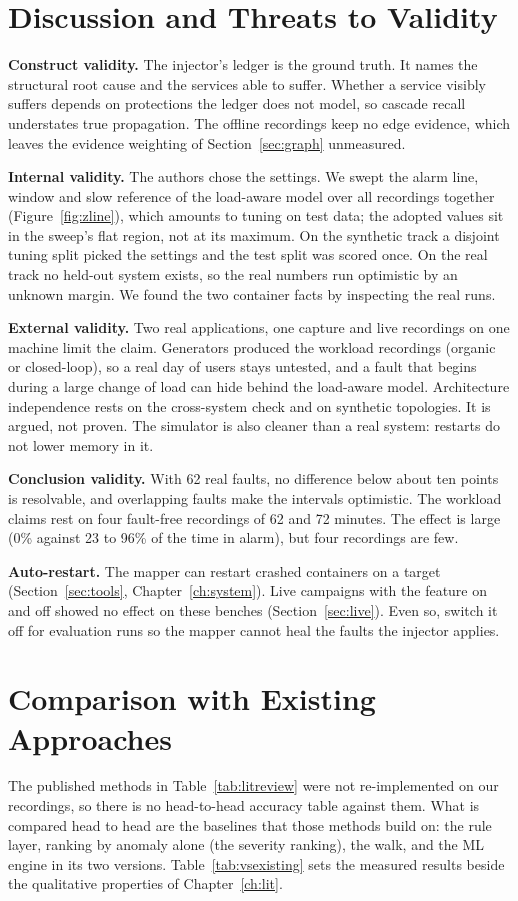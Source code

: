 \section{Discussion and Threats to Validity}
\textbf{Construct validity.} The injector's ledger is the ground truth. It names the structural root cause and the services able to suffer. Whether a service visibly suffers depends on protections the ledger does not model, so cascade recall understates true propagation. The offline recordings keep no edge evidence, which leaves the evidence weighting of Section~\ref{sec:graph} unmeasured.

\textbf{Internal validity.} The authors chose the settings. We swept the alarm line, window and slow reference of the load-aware model over all recordings together (Figure~\ref{fig:zline}), which amounts to tuning on test data; the adopted values sit in the sweep's flat region, not at its maximum. On the synthetic track a disjoint tuning split picked the settings and the test split was scored once. On the real track no held-out system exists, so the real numbers run optimistic by an unknown margin. We found the two container facts by inspecting the real runs.

\textbf{External validity.} Two real applications, one capture and live recordings on one machine limit the claim. Generators produced the workload recordings (organic or closed-loop), so a real day of users stays untested, and a fault that begins during a large change of load can hide behind the load-aware model. Architecture independence rests on the cross-system check and on synthetic topologies. It is argued, not proven. The simulator is also cleaner than a real system: restarts do not lower memory in it.

\textbf{Conclusion validity.} With 62 real faults, no difference below about ten points is resolvable, and overlapping faults make the intervals optimistic. The workload claims rest on four fault-free recordings of 62 and 72 minutes. The effect is large (0\% against 23 to 96\% of the time in alarm), but four recordings are few.

\textbf{Auto-restart.} The mapper can restart crashed containers on a target (Section~\ref{sec:tools}, Chapter~\ref{ch:system}). Live campaigns with the feature on and off showed no effect on these benches (Section~\ref{sec:live}). Even so, switch it off for evaluation runs so the mapper cannot heal the faults the injector applies.

\section{Comparison with Existing Approaches}
The published methods in Table~\ref{tab:litreview} were not re-implemented on our recordings, so there is no head-to-head accuracy table against them. What is compared head to head are the baselines that those methods build on: the rule layer, ranking by anomaly alone (the severity ranking), the walk, and the ML engine in its two versions. Table~\ref{tab:vsexisting} sets the measured results beside the qualitative properties of Chapter~\ref{ch:lit}.

